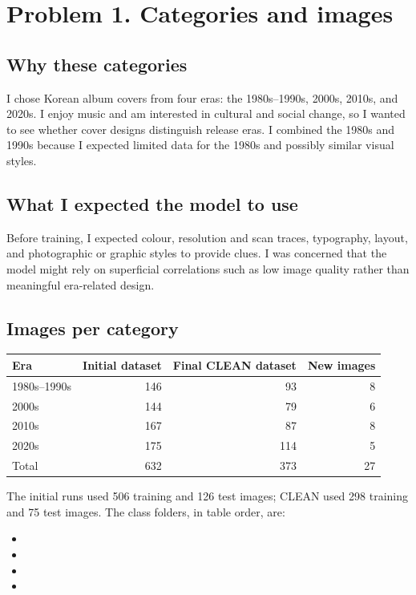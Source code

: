 \documentclass[11pt]{article}
\begin{document}
\makeheader

\section*{Problem 1. Categories and images}
\subsection*{Why these categories}
I chose Korean album covers from four eras: the 1980s--1990s, 2000s, 2010s, and 2020s. I enjoy music and am interested in cultural and social change, so I wanted to see whether cover designs distinguish release eras. I combined the 1980s and 1990s because I expected limited data for the 1980s and possibly similar visual styles.

\subsection*{What I expected the model to use}
Before training, I expected colour, resolution and scan traces, typography, layout, and photographic or graphic styles to provide clues. I was concerned that the model might rely on superficial correlations such as low image quality rather than meaningful era-related design.

\subsection*{Images per category}
\begin{center}
\begin{tabular}{lrrr}\toprule
Era & Initial dataset & Final CLEAN dataset & New images\\\midrule
1980s--1990s &146&93&8\\
2000s &144&79&6\\
2010s &167&87&8\\
2020s &175&114&5\\\midrule
Total &632&373&27\\\bottomrule
\end{tabular}
\end{center}
The initial runs used 506 training and 126 test images; CLEAN used 298 training and 75 test images. The class folders, in table order, are:
\begin{itemize}
\item {}
\item {}
\item {}
\item {}
\end{itemize}
\end{document}
